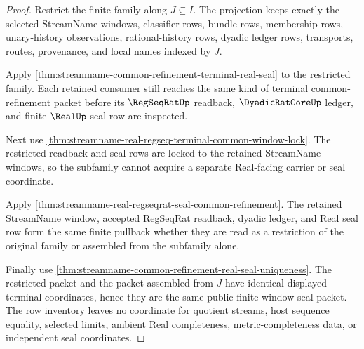 \begin{proof}
Restrict the finite family along $J \subseteq I$. The projection keeps exactly the selected StreamName windows, classifier rows, bundle rows, membership rows, unary-history observations, rational-history rows, dyadic ledger rows, transports, routes, provenance, and local names indexed by $J$.

Apply \autoref{thm:streamname-common-refinement-terminal-real-seal} to the restricted family. Each retained consumer still reaches the same kind of terminal common-refinement packet before its $\RegSeqRatUp$ readback, $\DyadicRatCoreUp$ ledger, and finite $\RealUp$ seal row are inspected.

Next use \autoref{thm:streamname-real-regseq-terminal-common-window-lock}. The restricted readback and seal rows are locked to the retained StreamName windows, so the subfamily cannot acquire a separate Real-facing carrier or seal coordinate.

Apply \autoref{thm:streamname-real-regseqrat-seal-common-refinement}. The retained StreamName window, accepted RegSeqRat readback, dyadic ledger, and Real seal row form the same finite pullback whether they are read as a restriction of the original family or assembled from the subfamily alone.

Finally use \autoref{thm:streamname-common-refinement-real-seal-uniqueness}. The restricted packet and the packet assembled from $J$ have identical displayed terminal coordinates, hence they are the same public finite-window seal packet. The row inventory leaves no coordinate for quotient streams, host sequence equality, selected limits, ambient Real completeness, metric-completeness data, or independent seal coordinates.
\end{proof}

